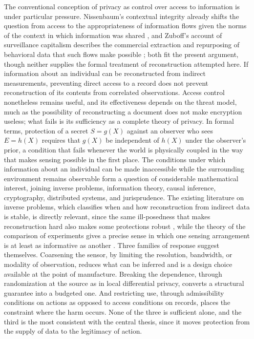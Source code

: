 \documentclass[11pt]{article}
\theoremstyle{plain}
\theoremstyle{definition}
\theoremstyle{remark}
\begin{document}
The conventional conception of privacy as control over access to information is under particular pressure. Nissenbaum's contextual integrity already shifts the question from access to the appropriateness of information flows given the norms of the context in which information was shared \cite{nissenbaum2010}, and Zuboff's account of surveillance capitalism describes the commercial extraction and repurposing of behavioral data that such flows make possible \cite{zuboff2019}; both fit the present argument, though neither supplies the formal treatment of reconstruction attempted here. If information about an individual can be reconstructed from indirect measurements, preventing direct access to a record does not prevent reconstruction of its contents from correlated observations. Access control nonetheless remains useful, and its effectiveness depends on the threat model, much as the possibility of reconstructing a document does not make encryption useless; what fails is its sufficiency as a complete theory of privacy. In formal terms, protection of a secret $S=g(X)$ against an observer who sees $E=h(X)$ requires that $g(X)$ be independent of $h(X)$ under the observer's prior, a condition that fails whenever the world is physically coupled in the way that makes sensing possible in the first place. The conditions under which information about an individual can be made inaccessible while the surrounding environment remains observable form a question of considerable mathematical interest, joining inverse problems, information theory, causal inference, cryptography, distributed systems, and jurisprudence. The existing literature on inverse problems, which classifies when and how reconstruction from indirect data is stable, is directly relevant, since the same ill-posedness that makes reconstruction hard also makes some protections robust \cite{engl1996}, while the theory of the comparison of experiments gives a precise sense in which one sensing arrangement is at least as informative as another \cite{blackwell1951}. Three families of response suggest themselves. Coarsening the sensor, by limiting the resolution, bandwidth, or modality of observation, reduces what can be inferred and is a design choice available at the point of manufacture. Breaking the dependence, through randomization at the source as in local differential privacy, converts a structural guarantee into a budgeted one. And restricting use, through admissibility conditions on actions as opposed to access conditions on records, places the constraint where the harm occurs. None of the three is sufficient alone, and the third is the most consistent with the central thesis, since it moves protection from the supply of data to the legitimacy of action.
\end{document}
